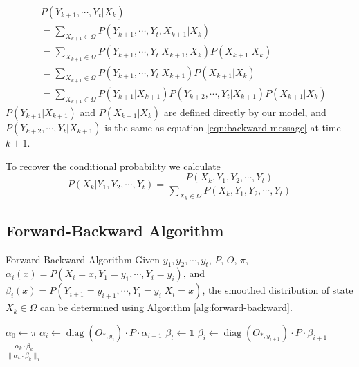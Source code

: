 \documentclass{beamer}
\DeclareMathOperator{\diag}{diag}
\begin{document}
\begin{frame}
\begin{align}
&P(Y_{k+1}, \cdots, Y_t | X_k) \label{eqn:backward-message}\\
&= \sum_{X_{k+1} \in \Omega}{P(Y_{k+1}, \cdots, Y_t, X_{k+1} | X_k)} \\
&= \sum_{X_{k+1} \in \Omega}{P(Y_{k+1}, \cdots, Y_t | X_{k+1} , X_k) P(X_{k+1} | X_k)} \\
&= \sum_{X_{k+1} \in \Omega}{P(Y_{k+1}, \cdots, Y_t | X_{k+1}) P(X_{k+1} | X_k)} \\
&= \sum_{X_{k+1} \in \Omega}{P(Y_{k+1} | X_{k+1}) P(Y_{k+2}, \cdots, Y_t | X_{k+1}) P(X_{k+1} | X_k)} 
\end{align}
$P(Y_{k+1} | X_{k+1})$ and $P(X_{k+1} | X_k)$ are defined directly by our model, and $P(Y_{k+2}, \cdots, Y_t | X_{k+1})$ is the same as equation \ref{eqn:backward-message} at time $k+1$.
\end{frame}

\begin{frame}
To recover the conditional probability we calculate
\begin{equation}
P(X_k | Y_1, Y_{2}, \cdots, Y_t) = \frac{P(X_k, Y_1, Y_{2}, \cdots, Y_t)}{\sum_{X_k \in \Omega}{P(X_k, Y_1, Y_{2}, \cdots, Y_t)}}
\end{equation}
\end{frame}

\subsection{Forward-Backward Algorithm}
\begin{frame}{Forward-Backward Algorithm}
Given $y_1, y_2, \cdots, y_t$, $P$, $O$, $\pi$, $\alpha_i(x) = P(X_i = x , Y_1 = y_1, \cdots, Y_i = y_i)$, and $\beta_i(x) = P(Y_{i+1} = y_{i+1}, \cdots, Y_i = y_i | X_i = x)$, the smoothed distribution of state $X_k \in \Omega$ can be determined using Algorithm \ref{alg:forward-backward}.
\begin{algorithm}[H]
\caption{Forward-Backward Algorithm}
\label{alg:forward-backward}
\begin{algorithmic}
\STATE $\alpha_0 \leftarrow \pi$
\STATE $\alpha_i \leftarrow \diag(O_{*,y_i}) \cdot P \cdot \alpha_{i-1}$
\ENDFOR
\STATE $\beta_t \leftarrow \mathds{1}$
\STATE $\beta_i \leftarrow \diag(O_{*,y_{i+1}}) \cdot P \cdot \beta_{i+1}$
\ENDFOR
\RETURN $\frac{\alpha_k \cdot \beta_k}{\|\alpha_k \cdot \beta_k\|_1}$
\end{algorithmic}
\end{algorithm}
\end{frame}
\end{document}
